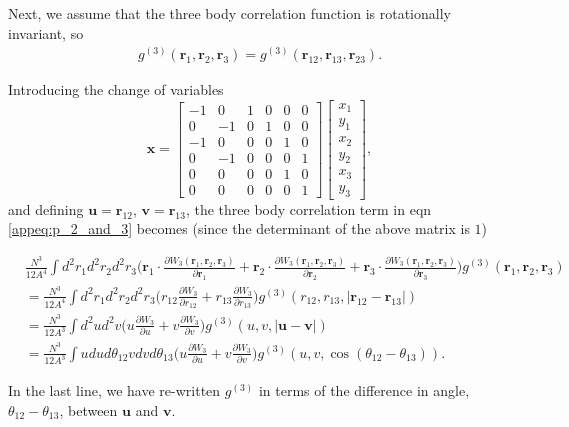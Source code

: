 \documentclass[../main.tex]{subfiles}
\begin{document}
Next, we assume that the three body correlation function is rotationally
invariant, so
\begin{align}
  g^{(3)}(\bm{r}_1,\bm{r}_2,\bm{r}_3)
  = g^{(3)}(\bm{r}_{12},\bm{r}_{13},\bm{r}_{23}).
\end{align}

Introducing the change of variables
\begin{equation}
  \bm{x}=
  \begin{bmatrix}
    -1 &  0 &  1 &  0 &  0 &  0 \\
    0  & -1 &  0 &  1 &  0 &  0 \\
    -1 &  0 &  0 &  0 &  1 &  0 \\
    0  & -1 &  0 &  0 &  0 &  1 \\
    0  &  0 &  0 &  0 &  1 &  0 \\
    0  &  0 &  0 &  0 &  0 &  1
  \end{bmatrix}
  \begin{bmatrix}
    x_1 \\
    y_1 \\
    x_2 \\
    y_2 \\
    x_3 \\
    y_3
  \end{bmatrix},
\end{equation}
and defining $\bm{u} = \bm{r}_{12}$, $\bm{v} = \bm{r}_{13}$,
the three body correlation term in eqn \ref{appeq:p_2_and_3}
becomes (since the determinant of the above matrix is $1$)
\begin{widetext}
  \begin{align}\label{eq:trans_inv_g3}
    &\frac{N^3}{12A^4}\int d^2r_1d^2r_2d^2r_3\bigg(
    \bm{r}_1\cdot
    \frac{\partial W_3(\bm{r}_1,\bm{r}_2,\bm{r}_3)}{\partial \bm{r}_1}
    +\bm{r}_2\cdot
    \frac{\partial W_3(\bm{r}_1,\bm{r}_2,\bm{r}_3)}{\partial \bm{r}_2}
    +\bm{r}_3\cdot
    \frac{\partial W_3(\bm{r}_1,\bm{r}_2,\bm{r}_3)}{\partial \bm{r}_3}
    \bigg)g^{(3)}(\bm{r}_1,\bm{r}_2,\bm{r}_3)\nonumber\\
    &=\frac{N^3}{12A^4}\int d^2r_1d^2r_2d^2r_3\bigg(
    r_{12}\frac{\partial W_3}{\partial r_{12}}+
    r_{13}\frac{\partial W_3}{\partial r_{13}}
    \bigg)g^{(3)}(r_{12},r_{13},|\bm{r}_{12}-\bm{r}_{13}|)\nonumber\\
    &=\frac{N^3}{12A^3}\int d^2ud^2v\bigg(
    u\frac{\partial W_3}{\partial u}+
    v\frac{\partial W_3}{\partial v}
    \bigg)g^{(3)}(u,v,|\bm{u}-\bm{v}|)\nonumber\\
    &=\frac{N^3}{12A^3}\int udud\theta_{12}vdvd\theta_{13}\bigg(
    u\frac{\partial W_3}{\partial u}+
    v\frac{\partial W_3}{\partial v}
    \bigg)g^{(3)}(u,v,\cos(\theta_{12}-\theta_{13})).
  \end{align}
\end{widetext}
In the last line, we have re-written $g^{(3)}$ in terms of the 
difference in angle, $\theta_{12}-\theta_{13}$, between $\bm{u}$ and
$\bm{v}$.
\end{document}
